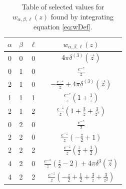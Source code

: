\documentclass[%
 preprint,
 amsmath,amssymb,
 aps,
]{revtex4-1}
\newcommand{\w}[4]{w_{#1,#2,#3}(#4)}
\begin{document}
\begin{table}
\begin{center}
\begin{tabular}{| c c c | c |}
\hline
$\alpha$ & $\beta$ & $\ell$ & $ \w{\alpha}{\beta}{\ell}{z}$ \\
\hline
0 & 0 & 0 & $ 4\pi \delta^{(3)}(\vec{z}) $ \\
0 & 1 & 0 & $ \frac{\displaystyle e^{-z}}{\displaystyle z} $ \\
2 & 1 & 0 & $ -\frac{\displaystyle e^{-z}}{\displaystyle z} + 4\pi \delta^{(3)}(\vec{z}) $ \\
1 & 1 & 1 &  $\frac{\displaystyle e^{-z}}{\displaystyle z} (1 + \tfrac{1}{z})  $ \\
2 & 1 & 2 & $ \frac{\displaystyle e^{-z}}{\displaystyle z} (1+ \tfrac{3}{z} + \tfrac{3}{z^2} )$ \\
0 & 2 & 0 & $ \frac{\displaystyle e^{-z}}{2} $ \\
2 & 2 & 0 & $ \frac{\displaystyle e^{-z}}{\displaystyle z} (-\tfrac{z}{2} + 1 ) $ \\
2 & 2 & 2 & $  \frac{\displaystyle e^{-z}}{\displaystyle z} (\tfrac{z}{2} + \tfrac{1}{2} ) $ \\
4 & 2 & 0 & $  \frac{\displaystyle e^{-z}}{\displaystyle z} (\tfrac{z}{2} - 2 ) + 4 \pi \delta^3( \vec{z} )  $ \\
4 & 2 & 2 & $  \frac{\displaystyle e^{-z}}{\displaystyle z} ( - \tfrac{z}{2} + \tfrac{1}{2} + \tfrac{3}{z} + \tfrac{3}{z^2} ) $ \\
\hline
\end{tabular}
\end{center}
\caption{\label{table:wTable} Table of selected values for $\w{\alpha}{\beta}{\ell}{z}$ found by integrating equation \eqref{eq:wDef}.}
\end{table}
\end{document}
